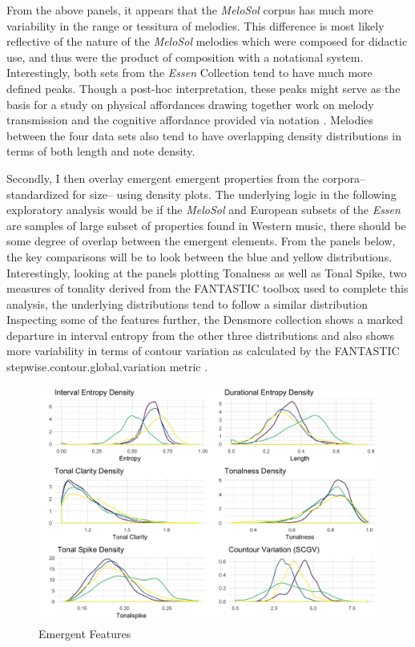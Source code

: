 \documentclass[12pt,]{book}
\begin{document}
From the above panels, it appears that the \emph{MeloSol} corpus has much more variability in the range or tessitura of melodies.
This difference is most likely reflective of the nature of the \emph{MeloSol} melodies which were composed for didactic use, and thus were the product of composition with a notational system.
Interestingly, both sets from the \emph{Essen} Collection tend to have much more defined peaks.
Though a post-hoc interpretation, these peaks might serve as the basis for a study on physical affordances drawing together work on melody transmission \citep{shanahanExaminingEffectOral2019} and the cognitive affordance provided via notation \citep{lerdahlCognitiveConstraintsCompositional1992}.
Melodies between the four data sets also tend to have overlapping density distributions in terms of both length and note density.

Secondly, I then overlay emergent emergent properties from the corpora-- standardized for size-- using density plots.
The underlying logic in the following exploratory analysis would be if the \emph{MeloSol} and European subsets of the \emph{Essen} are samples of large subset of properties found in Western music, there should be some degree of overlap between the emergent elements.
From the panels below, the key comparisons will be to look between the blue and yellow distributions.
Interestingly, looking at the panels plotting Tonalness as well as Tonal Spike, two measures of tonality derived from the FANTASTIC toolbox used to complete this analysis, the underlying distributions tend to follow a similar distribution
Inspecting some of the features further, the Densmore collection shows a marked departure in interval entropy from the other three distributions and also shows more variability in terms of contour variation as calculated by the FANTASTIC stepwise.contour.global.variation metric \citep{mullensiefenFantasticFeatureANalysis2009}.

\begin{figure}

{\centering \includegraphics[width=1\linewidth]{img/corporaemergent} 

}

\caption{Emergent Features}\label{fig:compemergent}
\end{figure}
\end{document}
